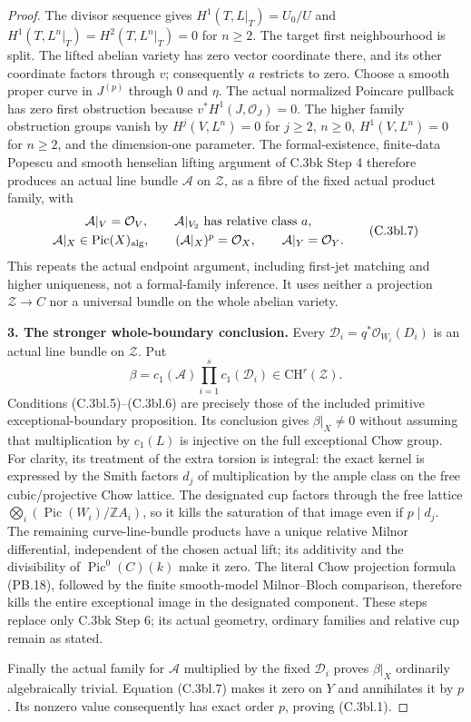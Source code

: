 \begin{proof}
The divisor sequence gives
$H^1(T,L|_T)=U_0/U$ and
$H^1(T,L^n|_T)=H^2(T,L^n|_T)=0$ for $n\ge2$.
The target first neighbourhood is split. The lifted abelian variety
has zero vector coordinate there, and its other coordinate factors
through $v$; consequently $a$ restricts to zero.
Choose a smooth proper curve in $J^{(p)}$ through $0$ and $\eta$.
The actual normalized Poincare pullback has zero first obstruction
because $v^*H^1(J,\mathcal O_J)=0$. The higher family obstruction
groups vanish by $H^j(V,L^n)=0$ for $j\ge2$, $n\ge0$,
$H^1(V,L^n)=0$ for $n\ge2$, and the dimension-one parameter.
The formal-existence, finite-data Popescu and smooth henselian
lifting argument of C.3bk Step 4 therefore produces an actual
line bundle $\mathcal A$ on $\mathcal Z$, as a fibre of the fixed
actual product family, with
\[
 \begin{gathered}
 \mathcal A|_V=\mathcal O_V,
 \qquad\mathcal A|_{V_2}\text{ has relative class }a,\\
 \mathcal A|_X\in\operatorname{Pic}(X)_{\rm alg},\qquad
 (\mathcal A|_X)^p=\mathcal O_X,
 \qquad\mathcal A|_Y=\mathcal O_Y.
 \end{gathered}
 \tag{C.3bl.7}
\]
This repeats the actual endpoint argument, including first-jet
matching and higher uniqueness, not a formal-family inference.
It uses neither a projection $\mathcal Z\to C$ nor a universal
bundle on the whole abelian variety.

\textbf{3. The stronger whole-boundary conclusion.}
Every $\mathcal D_i=q^*\mathcal O_{W_i}(D_i)$ is an actual line
bundle on $\mathcal Z$. Put
\[
 \beta=c_1(\mathcal A)\prod_{i=1}^s c_1(\mathcal D_i)
                                  \in\mathrm{CH}^r(\mathcal Z).
 \tag{C.3bl.8}
\]
Conditions (C.3bl.5)--(C.3bl.6) are precisely those of the included
primitive exceptional-boundary proposition. Its conclusion gives
$\beta|_X\ne0$ without assuming that multiplication by $c_1(L)$
is injective on the full exceptional Chow group.
For clarity, its treatment of the extra torsion is integral:
the exact kernel is expressed by the Smith factors $d_j$ of
multiplication by the ample class on the free cubic/projective
Chow lattice. The designated cup factors through the free lattice
$\bigotimes_i(\operatorname{Pic}(W_i)/\mathbb Z A_i)$, so it kills
the saturation of that image even if $p\mid d_j$.
The remaining curve-line-bundle products have a unique relative
Milnor differential, independent of the chosen actual lift; its
additivity and the divisibility of $\operatorname{Pic}^0(C)(k)$
make it zero. The literal Chow projection formula (PB.18), followed
by the finite smooth-model Milnor--Bloch comparison, therefore
kills the entire exceptional image in the designated component.
These steps replace only C.3bk Step 6; its actual geometry,
ordinary families and relative cup remain as stated.

Finally the actual family for $\mathcal A$ multiplied by the fixed
$\mathcal D_i$ proves $\beta|_X$ ordinarily algebraically trivial.
Equation (C.3bl.7) makes it zero on $Y$ and annihilates it by $p$.
Its nonzero value consequently has exact order $p$, proving
(C.3bl.1).
\end{proof}

